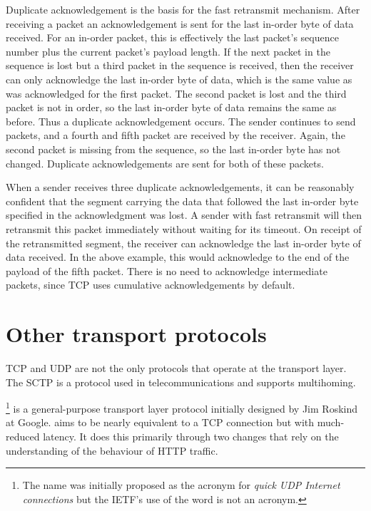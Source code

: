 Duplicate acknowledgement is the basis for the fast retransmit mechanism.
After receiving a packet an acknowledgement is sent for the last in-order byte of data received.
For an in-order packet, this is effectively the last packet's sequence number plus the current packet's payload length.
If the next packet in the sequence is lost but a third packet in the sequence is received, then the receiver can only acknowledge the last in-order byte of data, which is the same value as was acknowledged for the first packet.
The second packet is lost and the third packet is not in order, so the last in-order byte of data remains the same as before.
Thus a duplicate acknowledgement occurs.
The sender continues to send packets, and a fourth and fifth packet are received by the receiver.
Again, the second packet is missing from the sequence, so the last in-order byte has not changed.
Duplicate acknowledgements are sent for both of these packets.

When a sender receives three duplicate acknowledgements, it can be reasonably confident that the segment carrying the data that followed the last in-order byte specified in the acknowledgment was lost. 
A sender with fast retransmit will then retransmit this packet immediately without waiting for its timeout.
On receipt of the retransmitted segment, the receiver can acknowledge the last in-order byte of data received.
In the above example, this would acknowledge to the end of the payload of the fifth packet.
There is no need to acknowledge intermediate packets, since \acs{TCP} uses cumulative acknowledgements by default.




\section[Other transport protocols]{Other transport protocols\protect\marginsymbol}

\acs{TCP} and \acs{UDP} are not the only protocols that operate at the transport layer.
The \acf{SCTP} is a protocol used in telecommunications and supports multihoming.

%
   \footnote{The name was initially proposed as the acronym for \emph{quick \acs{UDP} Internet connections} but the \acs{IETF}'s use of the word is not an acronym.}
is a general-purpose transport layer protocol initially designed by Jim Roskind at Google.
 aims to be nearly equivalent to a \acs{TCP} connection but with much-reduced latency.
It does this primarily through two changes that rely on the understanding of the behaviour of \acs{HTTP} traffic.

